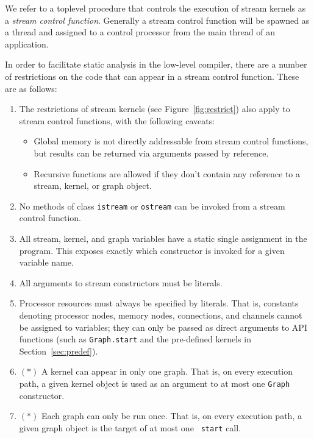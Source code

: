 
We refer to a toplevel procedure that controls the execution of stream
kernels as a {\it stream control function}.  Generally a stream
control function will be spawned as a thread and assigned to a control
processor from the main thread of an application.

In order to facilitate static analysis in the low-level compiler,
there are a number of restrictions on the code that can appear in a
stream control function.  These are as follows:

\begin{enumerate}

\item The restrictions of stream kernels (see
Figure~\ref{fig:restrict}) also apply to stream control functions,
with the following caveats:

\begin{itemize}

\item Global memory is not directly addressable from stream control
functions, but results can be returned via arguments passed by
reference.

\item Recursive functions are allowed if they don't contain any
reference to a stream, kernel, or graph object.

\end{itemize}

\item No methods of class {\tt istream} or {\tt ostream} can be
invoked from a stream control function.

\item All stream, kernel, and graph variables have a static single
assignment in the program.  This exposes exactly which constructor is
invoked for a given variable name.

\item All arguments to stream constructors must be literals.

\item Processor resources must always be specified by literals.  That
is, constants denoting processor nodes, memory nodes, connections, and
channels cannot be assigned to variables; they can only be passed as
direct arguments to API functions (such as {\tt Graph.start} and the
pre-defined kernels in Section~\ref{sec:predef}).

\item $(*)$ A kernel can appear in only one graph.  That is, on every
execution path, a given kernel object is used as an argument to at
most one {\tt Graph} constructor.

\item $(*)$ Each graph can only be run once.  That is, on every
execution path, a given graph object is the target of at most one {\tt
start} call.

\end{enumerate}

